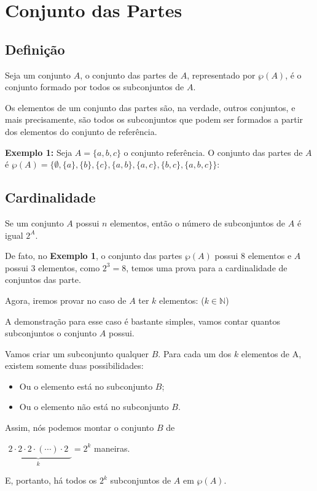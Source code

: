 {\selectfont }
\section{Conjunto das Partes}

\subsection{Definição}
Seja um conjunto $A$, o conjunto das partes de $A$, representado por $\wp(A)$, é o conjunto formado por todos os subconjuntos de $A$.

Os elementos de um conjunto das partes são, na verdade, outros conjuntos, e mais precisamente, são todos os subconjuntos que podem ser formados a partir dos elementos do conjunto de referência.

\textbf{Exemplo 1:}  Seja $A = \{a,b,c\}$ o conjunto referência.
O conjunto das partes de $A$ é $\wp(A)
= \{\emptyset,\{a\},\{b\},\{c\},\{a,b\},\{a,c\},\{b,c\},\{a,b,c\}\}$: 

\subsection{Cardinalidade}
Se um conjunto $A$ possui $n$ elementos, então o número de subconjuntos de $A$ é igual $2^A$.

De fato, no \textbf{Exemplo 1}, o conjunto das partes $\wp(A)$ possui 8 elementos e $A$ possui 3 elementos, como $2^3 = 8$, temos uma prova para a cardinalidade de conjuntos das parte.

Agora, iremos provar no caso de $A$ ter $k$ elementos: ($k \in  \mathbb{N}$) 

A demonstração para esse caso é bastante simples, vamos contar quantos subconjuntos o conjunto $A$ possui.

Vamos criar um subconjunto qualquer $B$. Para cada um dos $k$ elementos de A, existem somente duas possibilidades:

\begin{itemize}

\item Ou o elemento está no subconjunto $B$;
    
\item Ou o elemento não está no subconjunto $B$.
  
\end{itemize}

Assim, nós podemos montar o conjunto $B$ de
\begin{center}
    $\underbrace{\begin{matrix} 2\cdot2\cdot2\cdot(\cdots)\cdot2\end{matrix}}_{k} = 2^k$ maneiras.
\end{center}
E, portanto, há todos os $2^k$ subconjuntos de $A$ em $\wp(A)$.

